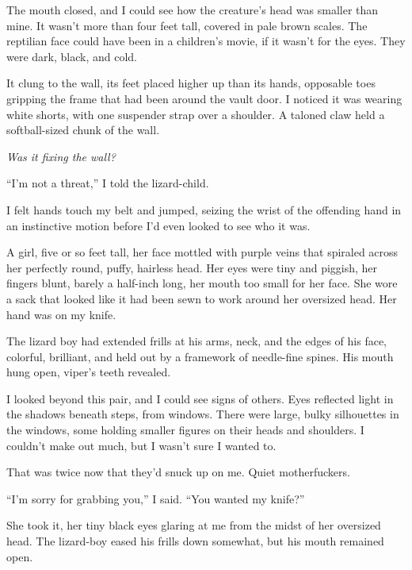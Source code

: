 The mouth closed, and I could see how the creature's head was smaller than mine.  It wasn't more than four feet tall, covered in pale brown scales.  The reptilian face could have been in a children's movie, if it wasn't for the eyes.  They were dark, black, and cold.



It clung to the wall, its feet placed higher up than its hands, opposable toes gripping the frame that had been around the vault door.  I noticed it was wearing white shorts, with one suspender strap over a shoulder.  A taloned claw held a softball-sized chunk of the wall.



\emph{Was it fixing the wall?}



``I'm not a threat,'' I told the lizard-child.



I felt hands touch my belt and jumped, seizing the wrist of the offending hand in an instinctive motion before I'd even looked to see who it was.



A girl, five or so feet tall, her face mottled with purple veins that spiraled across her perfectly round, puffy, hairless head.  Her eyes were tiny and piggish, her fingers blunt, barely a half-inch long, her mouth too small for her face.  She wore a sack that looked like it had been sewn to work around her oversized head.  Her hand was on my knife.



The lizard boy had extended frills at his arms, neck, and the edges of his face, colorful, brilliant, and held out by a framework of needle-fine spines.  His mouth hung open, viper's teeth revealed.



I looked beyond this pair, and I could see signs of others.  Eyes reflected light in the shadows beneath steps, from windows.  There were large, bulky silhouettes in the windows, some holding smaller figures on their heads and shoulders.  I couldn't make out much, but I wasn't sure I wanted to.



That was twice now that they'd snuck up on me.  Quiet motherfuckers.



``I'm sorry for grabbing you,'' I said.  ``You wanted my knife?''



She took it, her tiny black eyes glaring at me from the midst of her oversized head.  The lizard-boy eased his frills down somewhat, but his mouth remained open.



